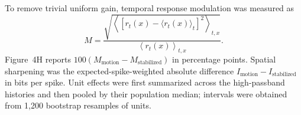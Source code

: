 \documentclass{lite}
\begin{document}
To remove trivial uniform gain, temporal response modulation was measured as
\begin{equation}
M =
\frac{
\sqrt{\left\langle
       [r_t(x)-\langle r_t(x)\rangle_t]^2
       \right\rangle_{t,x}}
}{
\left\langle r_t(x)\right\rangle_{t,x}
}.
\end{equation}
Figure~4H reports $100(M_{\mathrm{motion}}-M_{\mathrm{stabilized}})$ in percentage points. Spatial sharpening was the expected-spike-weighted absolute difference
$I_{\mathrm{motion}}-I_{\mathrm{stabilized}}$ in bits per spike. Unit effects were first summarized across the high-passband histories and then pooled by their population median; intervals were obtained from 1{,}200 bootstrap resamples of units.

\end{document}
